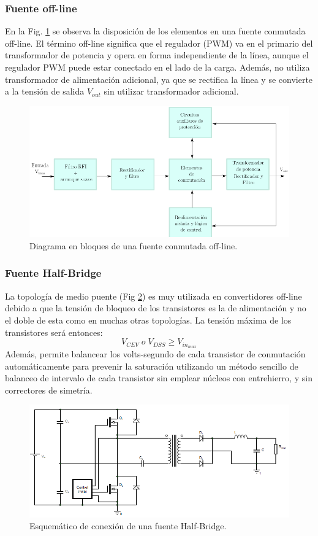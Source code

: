 \documentclass[11pt, a4paper]{article}
\begin{document}
\subsubsection{Fuente off-line}
En la Fig. \ref{esquema} se observa la disposición de los elementos en una fuente conmutada off-line. El término off-line significa que el regulador (PWM) va en el primario del transformador de potencia y opera en forma independiente de la línea, aunque el regulador PWM puede estar conectado en el lado de la carga. Además, no utiliza transformador de alimentación adicional, ya que se rectifica la línea y se convierte a la tensión de salida $V_{out}$ sin utilizar transformador adicional.
\begin{figure}[h]
	\centering
	\includegraphics[width = 12 cm]{Imagenes/esquema}
	\caption{Diagrama en bloques de una fuente conmutada off-line.}
	\label{esquema}
\end{figure}

\subsubsection{Fuente Half-Bridge}
La topología de medio puente (Fig \ref{halfbridge}) es muy utilizada en convertidores off-line debido a que la tensión de bloqueo de los transistores es la de alimentación y no el doble de esta como en muchas otras topologías. La tensión máxima de los transistores será entonces:
\[V_{CEV} \; o  \; V_{DSS} \geq V_{in_{max}} \]
Además, permite balancear los volts-segundo de cada transistor de conmutación automáticamente para prevenir la saturación utilizando un método sencillo de balanceo de intervalo de cada transistor sin emplear núcleos con entrehierro, y sin correctores de simetría.

\begin{figure}[h]
	\centering
	\includegraphics[width = 12 cm]{Imagenes/halfbridge}
	\caption{Esquemático de conexión de una fuente Half-Bridge.}
	\label{halfbridge}
\end{figure}
\end{document}
